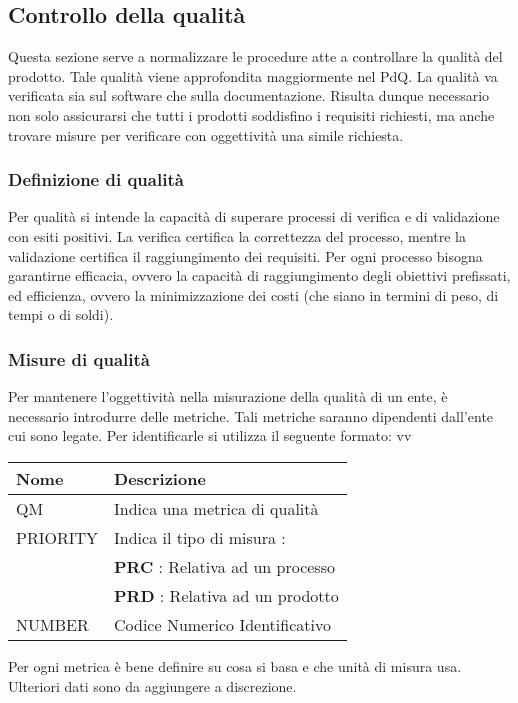 \subsection{Controllo della qualità}
Questa sezione serve a normalizzare le procedure atte a controllare la qualità del prodotto.
Tale qualità viene approfondita maggiormente nel PdQ. \newline
La qualità va verificata sia sul software che sulla documentazione. \newline
Risulta dunque necessario non solo assicurarsi che tutti i prodotti soddisfino i requisiti richiesti, 
ma anche trovare misure per verificare con oggettività una simile richiesta.
\subsubsection{Definizione di qualità}
Per qualità si intende la capacità di superare processi di verifica e di validazione con esiti positivi. \newline 
La verifica certifica la correttezza del processo, mentre la validazione certifica il raggiungimento dei requisiti. \newline
Per ogni processo bisogna garantirne efficacia, ovvero la capacità di raggiungimento degli obiettivi 
prefissati, ed efficienza, ovvero la minimizzazione dei costi (che siano in termini di peso, di tempi o di soldi).
\subsubsection{Misure di qualità}
Per mantenere l'oggettività nella misurazione della qualità di un ente, è necessario introdurre delle metriche.
Tali metriche saranno dipendenti dall'ente cui sono legate. \newline
Per identificarle si utilizza il seguente formato:
vv
\renewcommand{\arraystretch}{1.8} %
    \begin{tabular}{ |m{7em}|m{30em}| }
        \hline
        \textbf{Nome} & \textbf{Descrizione} \\
        \hline
            QM & Indica una metrica di qualità \\
        \hline
            PRIORITY 	& 	Indica il tipo di misura : \\
                        &	\textbf{PRC} : Relativa ad un processo \\
                        &	\textbf{PRD} : Relativa ad un prodotto \\
        \hline
            NUMBER & Codice Numerico Identificativo \\
        \hline
    \end{tabular} \newline \newline
Per ogni metrica è bene definire su cosa si basa e che unità di misura usa. Ulteriori dati sono da aggiungere
a discrezione.
